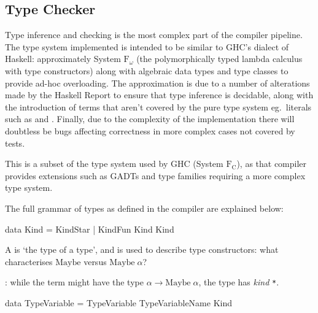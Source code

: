 \documentclass[dissertation.tex]{subfiles}
\begin{document}
{{{\begin{itemize}
{                
            }
            \end{itemize}
        }
    }
    \subsection{Type Checker}
    {

        Type inference and checking is the most complex part of the compiler pipeline. The type system implemented is
        intended to be similar to GHC's dialect of Haskell: approximately System \(\text{F}_\omega\) (the
        polymorphically typed lambda calculus with type constructors) along with algebraic data types and type classes
        to provide ad-hoc overloading. The approximation is due to a number of alterations made by the Haskell Report to
        ensure that type inference is decidable, along with the introduction of terms that aren't covered by the pure
        type system eg.\ literals such as  and . Finally, due to the complexity of the
        implementation there will doubtless be bugs affecting correctness in more complex cases not covered by tests.
        
        This is a subset of the type system used by GHC (System \(\text{F}_\text{C}\)), as that compiler provides
        extensions such as GADTs and type families requiring a more complex type system.

        The full grammar of types as defined in the compiler are explained below:

        \begin{haskellfigure}
        data Kind = KindStar
                  | KindFun Kind Kind
        \end{haskellfigure}

        A  is `the type of a type', and is used to describe type constructors: what characterises
        \(\text{Maybe}\) versus \(\text{Maybe}\;\alpha\)?
        
        : while the term  might have the type
        \(\alpha\rightarrow\text{Maybe}\;\alpha\), the type has \textit{kind} \texttt{*}. 



        \begin{haskellfigure}
        data TypeVariable = TypeVariable TypeVariableName Kind


\end{haskellfigure}}}
\end{document}
